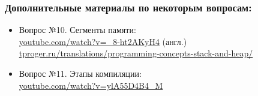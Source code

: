 \documentclass{article}
\begin{document}
\subsubsection*{Дополнительные материалы по некоторым вопросам:}
\begin{itemize}

\item Вопрос №10. Сегменты памяти:\\
\href{https://www.youtube.com/watch?v=_8-ht2AKyH4}{youtube.com/watch?v=\_8-ht2AKyH4}  (англ.)\\
\href{https://tproger.ru/translations/programming-concepts-stack-and-heap/}{tproger.ru/translations/programming-concepts-stack-and-heap/}
\item Вопрос №11. Этапы компиляции:\\
\href{https://www.youtube.com/watch?v=ylA55D4B4_M}{youtube.com/watch?v=ylA55D4B4\_M}

\end{itemize}
\end{document}
